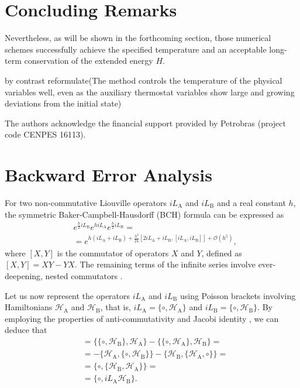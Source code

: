 \documentclass[
journal=jctcce,
layout=twocolumn
]{achemso}
\newcommand{\Ham}[1]{{\mathcal H}_\text{#1}}    %
\newcommand{\Liu}[1]{i\!L_\text{#1}}            %
\newcommand{\timestep}{h}
\begin{document}

\section{Concluding Remarks}
\label{sec:conclusion}
Nevertheless, as will be shown in the forthcoming section, those numerical schemes successfully achieve the specified temperature and an acceptable long-term conservation of the extended energy $H$.

by contrast
reformulate(The method controls the temperature of the physical variables well, even as the auxiliary thermostat variables show large and growing deviations from the initial state)
\begin{acknowledgement}
	The authors acknowledge the financial support provided by Petrobras (project code CENPES 16113).
\end{acknowledgement}

\appendix

\section{Backward Error Analysis}
\label{sec:rigid body shadow hamiltonian}

For two non-commutative Liouville operators $\Liu A$ and $\Liu B$ and a real constant $\timestep$, the symmetric Baker-Campbell-Hausdorff (BCH) formula can be expressed as \cite{Hairer_2006}
\begin{equation}
\label{eq:symmetric BCH}
\begin{split}
&e^{\frac{\timestep}{2} \Liu B} e^{\timestep \Liu A} e^{\frac{\timestep}{2} \Liu B} = \\
&= e^{\timestep (\Liu A + \Liu B) + \frac{\timestep^3}{24} \left[2 \Liu A + \Liu B,[\Liu A,\Liu B]\right] + \mathcal{O}(\timestep^5)},
\end{split}
\end{equation}
where $[X,Y]$ is the commutator of operators $X$ and $Y$, defined as $[X,Y] = XY - YX$.
The remaining terms of the infinite series involve ever-deepening, nested commutators \cite{Hairer_2006}.

Let us now represent the operators $\Liu A$ and $\Liu B$ using Poisson brackets involving Hamiltonians $\Ham A$ and $\Ham B$, that is, $\Liu A = \{\circ,\Ham A\}$ and $\Liu B = \{\circ,\Ham B\}$.
By employing the properties of anti-commutativity and Jacobi identity \cite{Hairer_2006}, we can deduce that
\begin{align*}
[\Liu A,\Liu B] &= \{\{\circ,\Ham B\},\Ham A\} - \{\{\circ,\Ham A\},\Ham B\} = \\
&= -\{\Ham A,\{\circ,\Ham B\}\} - \{\Ham B,\{\Ham A,\circ\}\} = \\
&= \{\circ,\{\Ham B,\Ham A\}\} = \\
&= \{\circ,{\Liu A} {\Ham B}\}.
\end{align*}
\end{document}
